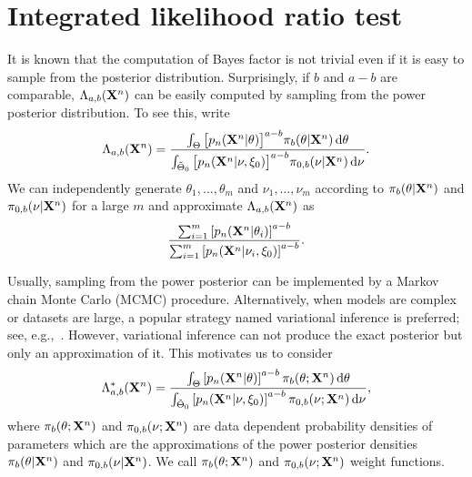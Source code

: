 \documentclass[11pt]{article}
\theoremstyle{plain}
\theoremstyle{definition}
\theoremstyle{remark}
\begin{document}
\section{Integrated likelihood ratio test} \label{sec:ilrt}

It is known that the computation of Bayes factor is not trivial even if it is easy to sample from the posterior distribution.
Surprisingly, if $b$ and $a-b$ are comparable, $\Lambda_{a,b}(\mathbf{X}^n)$ can be easily computed by sampling from the power posterior distribution.
To see this, write
\begin{equation*}
    \Lambda_{a,b}(\mathbf{X}^n)
    =
    \frac{\int_{\Theta} \big[p_n(\mathbf{X}^{n}|\theta)\big]^{a-b}\pi_b(\theta|\mathbf{X}^{n})\,\mathrm d\theta}{\int_{\tilde{\Theta}_0} \big[p_n(\mathbf{X}^{n}|\nu,\xi_0)\big]^{a-b}\pi_{0,b}(\nu|\mathbf{X}^{n})\, \mathrm d\nu}.
\end{equation*}
We can independently generate $\theta_1,\ldots,\theta_m$ and $\nu_1,\ldots,\nu_m$ according to $\pi_b(\theta|\mathbf{X}^{n})$ and $\pi_{0,b}(\nu | \mathbf{X}^{n})$ for a large $m$ and approximate $\Lambda_{a,b} (\mathbf{X}^n)$ as
\begin{equation*}
    \frac{\sum_{i=1}^m \left[p_n(\mathbf{X}^{n}|\theta_i)\right]^{a-b}}{\sum_{i=1}^m\left[p_n(\mathbf{X}^{n}|\nu_i,\xi_0)\right]^{a-b}}.
\end{equation*}

Usually, sampling from the power posterior can be implemented by a Markov chain Monte Carlo (MCMC) procedure.
Alternatively, when models are complex or datasets are large, a popular strategy named variational inference is preferred; see, e.g.,~\cite{Blei2017}.
However, variational inference can not produce the exact posterior but only an approximation of it.
This motivates us to consider
\begin{equation}
    \Lambda^*_{a,b} (\mathbf{X}^n) = \frac{\int_{\Theta} \left[p_n(\mathbf{X}^{n}|\theta)\right]^{a-b}\pi_b (\theta;\mathbf{X}^{n})\,\mathrm d\theta}{\int_{\tilde{\Theta}_0} \left[p_n(\mathbf{X}^{n}|\nu,\xi_0)\right]^{a-b}\pi_{0,b}(\nu;\mathbf{X}^{n})\, \mathrm d\nu},
\label{eq:definition}
\end{equation}
where $\pi_b(\theta;\mathbf{X}^{n})$ and $\pi_{0,b}(\nu;\mathbf{X}^{n})$ are data dependent probability densities of parameters which are the approximations of the power posterior densities $\pi_b(\theta | \mathbf{X}^{n})$ and $\pi_{0,b}(\nu | \mathbf{X}^{n})$.
We call $\pi_b(\theta;\mathbf{X}^{n})$ and $\pi_{0,b}(\nu;\mathbf{X}^{n})$ weight functions.
\end{document}

